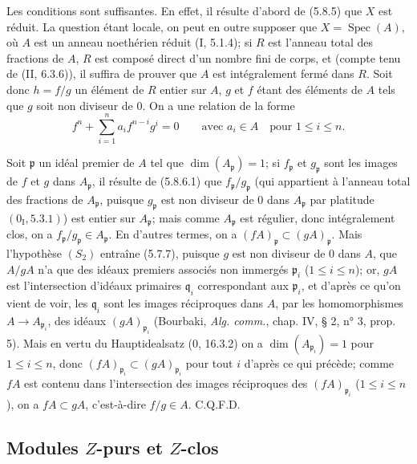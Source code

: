 \documentclass[10pt,oneside]{book}
\newcommand{\oldpage}[2][]{%
  \setcounter{footnote}{0}%
  \marginpar{\scriptsize\textbf{#1}~|~#2}\ignorespaces}
\begin{document}
Les conditions sont suffisantes. En effet, il résulte d'abord de (5.8.5) que
$X$ est réduit. La question étant locale, on peut en outre supposer que
$X=\operatorname{Spec}(A)$, où $A$ est un anneau noethérien réduit
(I, 5.1.4); si $R$ est l'anneau total des fractions de $A$, $R$ est composé
direct d'un nombre fini de corps, et (compte tenu de (II, 6.3.6)), il suffira
de prouver que $A$ est intégralement fermé dans $R$. Soit donc $h=f/g$ un
élément de $R$ entier sur $A$, $g$ et $f$ étant des éléments de $A$ tels que
$g$ soit non diviseur de 0. On a une relation de la forme
\begin{equation}
f^n+\sum_{i=1}^n a_i f^{n-i}g^i=0
\qquad\text{avec }a_i\in A\quad\text{pour }1\leq i\leq n.
\tag{5.8.6.1}\label{IV.2.s5.8.6.1-fr}
\end{equation}

Soit $\mathfrak p$ un idéal premier de $A$ tel que
$\dim(A_{\mathfrak p})=1$; si $f_{\mathfrak p}$ et $g_{\mathfrak p}$ sont
les images de $f$ et $g$ dans $A_{\mathfrak p}$, il résulte de (5.8.6.1) que
$f_{\mathfrak p}/g_{\mathfrak p}$ (qui appartient à l'anneau total des
fractions de $A_{\mathfrak p}$, puisque $g_{\mathfrak p}$ est non diviseur
de 0 dans $A_{\mathfrak p}$ par platitude $(0_{\mathrm I},5.3.1)$) est entier
sur $A_{\mathfrak p}$; mais comme $A_{\mathfrak p}$ est régulier, donc
intégralement clos, on a $f_{\mathfrak p}/g_{\mathfrak p}\in A_{\mathfrak p}$.
En d'autres termes, on a
$(fA)_{\mathfrak p}\subset(gA)_{\mathfrak p}$. Mais l'hypothèse $(S_2)$
entraîne (5.7.7), puisque $g$ est non diviseur de 0 dans $A$, que $A/gA$
n'a que des idéaux premiers associés non immergés $\mathfrak p_i$
($1\leq i\leq n$); or, $gA$ est l'intersection d'idéaux primaires
$\mathfrak q_i$ correspondant aux $\mathfrak p_i$, et d'après ce qu'on vient
de voir, les $\mathfrak q_i$ sont les images réciproques dans $A$, par les
homomorphismes $A\to A_{\mathfrak p_i}$, des idéaux
$(gA)_{\mathfrak p_i}$ (Bourbaki, \emph{Alg. comm.}, chap. IV, § 2, n° 3,
prop. 5). Mais en vertu du Hauptidealsatz (0, 16.3.2) on a
$\dim(A_{\mathfrak p_i})=1$ pour $1\leq i\leq n$, donc
$(fA)_{\mathfrak p_i}\subset(gA)_{\mathfrak p_i}$ pour tout $i$ d'après ce
qui précède; comme $fA$ est contenu dans l'intersection des images
réciproques des $(fA)_{\mathfrak p_i}$ ($1\leq i\leq n$), on a
$fA\subset gA$, c'est-à-dire $f/g\in A$. C.Q.F.D.

\oldpage[IV-2]{109}

\subsection{\texorpdfstring{Modules $Z$-purs et $Z$-clos}{Modules Z-purs et Z-clos}}
\end{document}
